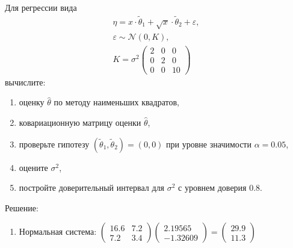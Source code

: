 \documentclass[a4paper,12pt]{article}
\begin{document}
\begin{enumerate}
            Для регрессии вида
            \begin{gather*}
                  \eta = x \cdot \widetilde{\theta}_1 + \sqrt{x} \cdot \widetilde{\theta}_2 + \varepsilon , \\
                  \varepsilon \sim \mathcal{N} ( 0, K ), \\
                  K =
                  \sigma^2
                  \begin{pmatrix}
                        2 & 0 & 0  \\
                        0 & 2 & 0  \\
                        0 & 0 & 10
                  \end{pmatrix}
            \end{gather*}
            вычислите:
            \begin{enumerate}
                  \item оценку $\widehat{\theta}$ по методу наименьших квадратов,
                  \item ковариационную матрицу оценки $\widehat{\theta}$,
                  \item проверьте гипотезу $(\widetilde{\theta}_1, \widetilde{\theta}_2) = (0, 0)$ при уровне значимости $\alpha = 0.05$,
                  \item оцените $\sigma^2$,
                  \item постройте доверительный интервал для $\sigma^2$ с уровнем доверия 0.8.
            \end{enumerate}

            Решение:
            \begin{enumerate}
                  \item Нормальная система:
                        $
                              \begin{pmatrix}
                                    16.6 & 7.2 \\
                                    7.2  & 3.4
                              \end{pmatrix}
                              \begin{pmatrix}
                                    2.19565 \\
                                    -1.32609
                              \end{pmatrix}
                              =
                              \begin{pmatrix}
                                    29.9 \\
                                    11.3
                              \end{pmatrix}
                        $


\end{enumerate}
\end{enumerate}
\end{document}
